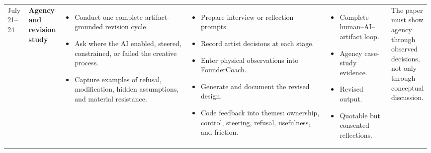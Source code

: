 \documentclass{article}
\begin{document}
\begin{landscape}
\begin{longtable}{
    L{0.05\linewidth}
    L{0.08\linewidth}
    L{0.3\linewidth}
    L{0.33\linewidth}
    L{0.15\linewidth}
    L{0.08\linewidth}
}
July 21--24
&
\textbf{Agency and revision study}
&
\begin{itemize}[leftmargin=*,nosep]
    \item Conduct one complete artifact-grounded revision cycle.
    \item Ask where the AI enabled, steered, constrained, or failed
    the creative process.
    \item Capture examples of refusal, modification, hidden assumptions,
    and material resistance.
\end{itemize}
&
\begin{itemize}[leftmargin=*,nosep]
    \item Prepare interview or reflection prompts.
    \item Record artist decisions at each stage.
    \item Enter physical observations into FounderCoach.
    \item Generate and document the revised design.
    \item Code feedback into themes:
    ownership, control, steering, refusal, usefulness, and friction.
\end{itemize}
&
\begin{itemize}[leftmargin=*,nosep]
    \item Complete human--AI--artifact loop.
    \item Agency case-study evidence.
    \item Revised output.
    \item Quotable but consented reflections.
\end{itemize}
&
The paper must show agency through observed decisions,
not only through conceptual discussion.
\\


\end{longtable}
\end{landscape}
\end{document}
